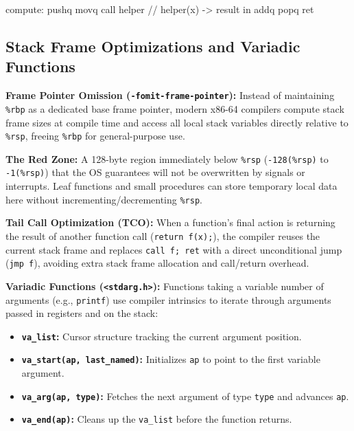 \begin{codeexample}
compute:
    pushq %
    movq  %
    call  helper            // helper(x) -> result in %
    addq  %
    popq  %
    ret
\end{codeexample}

\subsection{Stack Frame Optimizations and Variadic Functions}

\begin{remark}
    \textbf{Frame Pointer Omission (\texttt{-fomit-frame-pointer}):} Instead of maintaining \texttt{\%rbp} as a dedicated base frame pointer, modern x86-64 compilers compute stack frame sizes at compile time and access all local stack variables directly relative to \texttt{\%rsp}, freeing \texttt{\%rbp} for general-purpose use.
\end{remark}

\begin{definition}
    \textbf{The Red Zone:} A 128-byte region immediately below \texttt{\%rsp} (\texttt{-128(\%rsp)} to \texttt{-1(\%rsp)}) that the OS guarantees will not be overwritten by signals or interrupts. Leaf functions and small procedures can store temporary local data here without incrementing/decrementing \texttt{\%rsp}.
\end{definition}

\begin{definition}
    \textbf{Tail Call Optimization (TCO):} When a function's final action is returning the result of another function call (\texttt{return f(x);}), the compiler reuses the current stack frame and replaces \texttt{call f; ret} with a direct unconditional jump (\texttt{jmp f}), avoiding extra stack frame allocation and call/return overhead.
\end{definition}

\begin{definition}
    \textbf{Variadic Functions (\texttt{<stdarg.h>}):} Functions taking a variable number of arguments (e.g., \texttt{printf}) use compiler intrinsics to iterate through arguments passed in registers and on the stack:
    \begin{itemize}
        \item \textbf{\texttt{va\_list}:} Cursor structure tracking the current argument position.
        \item \textbf{\texttt{va\_start(ap, last\_named)}:} Initializes \texttt{ap} to point to the first variable argument.
        \item \textbf{\texttt{va\_arg(ap, type)}:} Fetches the next argument of type \texttt{type} and advances \texttt{ap}.
        \item \textbf{\texttt{va\_end(ap)}:} Cleans up the \texttt{va\_list} before the function returns.
    \end{itemize}
\end{definition}
